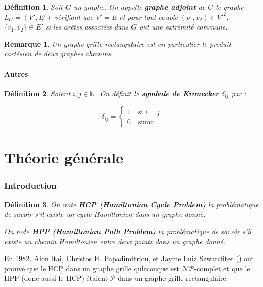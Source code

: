 \documentclass[french,a4paper]{article}
\newtheorem{definition}{Définition}[section]
\newtheorem{remark}{Remarque}[section]
\begin{document}
\begin{definition}
Soit $G$ un graphe. On appelle \textbf{graphe adjoint} de $G$ le graphe $L_{G}=(V',E')$ vérifiant que $V'=E$ et pour tout couple $(v_{1},v_{2}) \in V'^{2}$, $\{v_{1},v_{2}\} \in E'$ si les arêtes associées dans $G$ ont une extrémité commune.
\end{definition}



\begin{remark}
Un graphe grille rectangulaire est en particulier le produit cartésien de deux graphes chemins.
\end{remark}

\subsection{Autres}

\begin{definition}
Soient $i,j \in \mathbb{N}$. On définit le \textbf{symbole de Kronecker} $\delta_{ij}$ par :

\[
\delta_{ij}=\begin{cases} 1 \quad \text{si $i=j$} \\ 0 \quad \text{sinon} \end{cases}
\]

\end{definition}

\newpage
\part{Théorie générale}

\section{Introduction}

\begin{definition}
On note \textbf{HCP (Hamiltonian Cycle Problem)} la problématique de savoir s'il existe un cycle Hamiltonien dans un graphe donné.

On note \textbf{HPP (Hamiltonian Path Problem)} la problématique de savoir s'il existe un chemin Hamiltonien entre deux points dans un graphe donné.
\end{definition}

En 1982, Alon Itai, Christos H. Papadimitriou, et Jayme Luiz Szwarcfiter (\cite{IAPCSzJ1982}) ont prouvé que le HCP dans un graphe grille quleconque est $\mathcal{NP}$-complet et que le HPP (donc aussi le HCP) étaient $\mathcal{P}$ dans un graphe grille rectangulaire.
\end{document}
